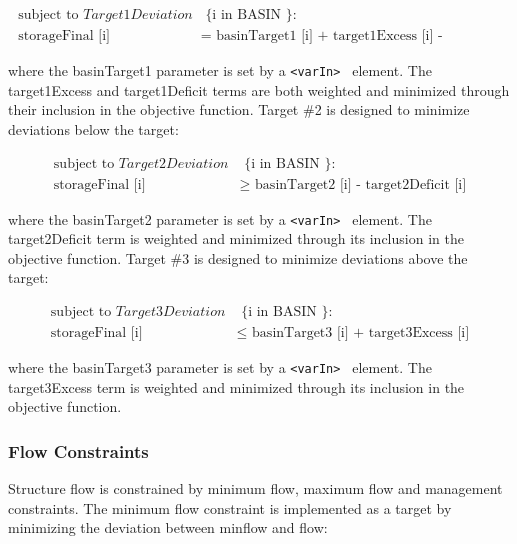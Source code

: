 \begin{equation}
 \begin{split}
  \textrm { subject to } Target1Deviation  & \textrm { \{ i in BASIN \} } : \\
  \textrm { storageFinal [i] } & = \textrm { basinTarget1 [i] + target1Excess [i] - target1Deficit [i] }
 \end{split}
\end{equation} 

where the basinTarget1 parameter is set by a {\tt <varIn> } element.
The target1Excess and target1Deficit terms are both weighted and
minimized through their inclusion in the objective function.  Target
\#2 is designed to minimize deviations below the target:

\begin{equation}
 \begin{split}
  \textrm { subject to } Target2Deviation  & \textrm { \{ i in BASIN \} } : \\
  \textrm { storageFinal [i] } & \ge \textrm { basinTarget2 [i] - target2Deficit [i] }
 \end{split}
\end{equation}

where the basinTarget2 parameter is set by a {\tt <varIn> } element.
The target2Deficit term is weighted and minimized through its
inclusion in the objective function.  Target \#3 is designed to
minimize deviations above the target:

\begin{equation}
 \begin{split}
  \textrm { subject to } Target3Deviation & \textrm { \{ i in BASIN \} } : \\
  \textrm { storageFinal [i] } & \le \textrm { basinTarget3 [i] + target3Excess [i] }
 \end{split}
\end{equation}

where the basinTarget3 parameter is set by a {\tt <varIn> } element.
The target3Excess term is weighted and minimized through its inclusion
in the objective function.

\subsubsection {Flow Constraints }

Structure flow is constrained by minimum flow, maximum flow and
management constraints.  The minimum flow constraint is implemented as
a target by minimizing the deviation between minflow and flow:

